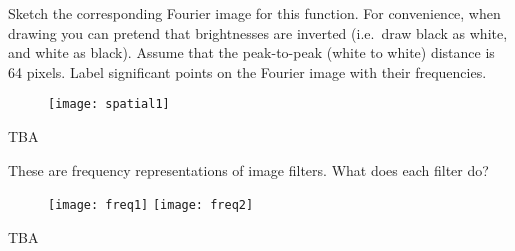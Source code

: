\begin{blocksection}
\question Sketch the corresponding Fourier image for this function. For convenience, when drawing you can pretend that brightnesses are inverted (i.e.~draw black as white, and white as black). Assume that the peak-to-peak (white to white) distance is 64 pixels. Label significant points on the Fourier image with their frequencies.

\begin{figure}[H]
\centering
\texttt{[image: spatial1]}
\end{figure}

\vspace*{20mm}

\begin{solution}[0.75in]
{\color{red} TBA}
\end{solution}
\end{blocksection}


\begin{blocksection}
\question These are frequency representations of image filters. What does each filter do?

\begin{figure}[H]
\centering
\texttt{[image: freq1]} \hspace*{4mm} \texttt{[image: freq2]}
\end{figure}

\begin{solution}[0.75in]
{\color{red} TBA}
\end{solution}
\end{blocksection}
